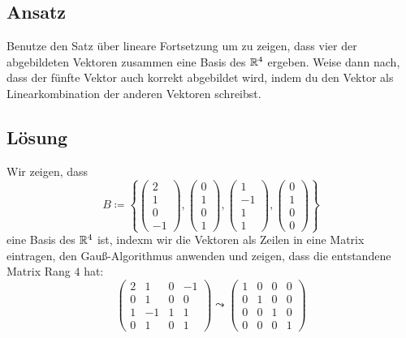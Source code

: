 \subsection{Ansatz}
Benutze den Satz über lineare Fortsetzung um zu zeigen, dass vier der abgebildeten Vektoren zusammen eine Basis des \( \mathbb{R}^4 \) ergeben. Weise dann nach, dass der fünfte Vektor auch korrekt abgebildet wird, indem du den Vektor als Linearkombination der anderen Vektoren schreibst.

\subsection{Lösung}
Wir zeigen, dass
\begin{equation*}
	B \coloneqq \left \{ \begin{pmatrix}
		2 \\ 1 \\ 0 \\ -1
	\end{pmatrix}, \begin{pmatrix}
		0 \\ 1 \\ 0 \\ 1
	\end{pmatrix}, \begin{pmatrix}
		1 \\ -1 \\ 1 \\ 1
	\end{pmatrix}, \begin{pmatrix}
		0 \\ 1 \\ 0 \\ 0
	\end{pmatrix} \right \}
\end{equation*}
eine Basis des \( \mathbb{R}^4 \) ist, indexm wir die Vektoren als Zeilen in eine Matrix eintragen, den Gauß-Algorithmus anwenden und zeigen, dass die entstandene Matrix Rang \( 4 \) hat:
\begin{equation*}
	\begin{pmatrix}
		2 & 1 & 0 & -1 \\
		0 & 1 & 0 & 0 \\
		1 & -1 & 1 & 1 \\
		0 & 1 & 0 & 1
	\end{pmatrix} \leadsto \begin{pmatrix}
		1 & 0 & 0 & 0 \\
		0 & 1 & 0 & 0 \\
		0 & 0 & 1 & 0 \\
		0 & 0 & 0 & 1
	\end{pmatrix}
\end{equation*}
